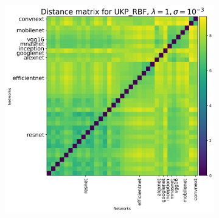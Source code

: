 \documentclass[11pt]{article}
\theoremstyle{plain}
\begin{document}
\begin{figure}[!h]
\begin{subfigure}[b]{0.3\textwidth}
    \end{subfigure}
    \hfill
    \begin{subfigure}[b]{0.3\textwidth}
        \includegraphics[width=\textwidth]{Appendix figures/imagenet_experiments/Heatmaps final/Heatmap for UKP_dist_RBF_1.000000e+00_1.000000e-03.png}
    \end{subfigure}
    
    \vspace{0.5cm}  %
    

\end{figure}
\end{document}
